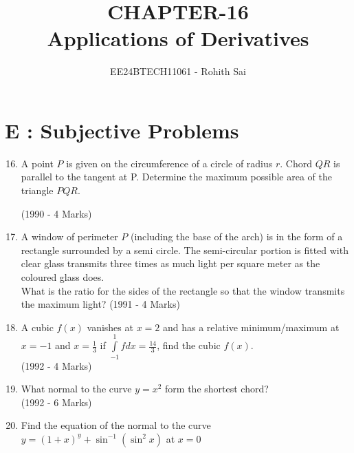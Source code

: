 \documentclass[journal,12pt,twocolumn]{IEEEtran}
\theoremstyle{remark}
\begin{document}

\vspace{3cm}

\title{CHAPTER-16\\Applications of Derivatives}
\author{EE24BTECH11061 - Rohith Sai}
\maketitle
\newpage
\bigskip

\renewcommand{\thefigure}{\theenumi}
\renewcommand{\thetable}{\theenumi}

\fontsize{12}{17}\selectfont
\section{E : Subjective Problems}

\begin{enumerate}
\setcounter{enumi}{15}
\item A point $P$ is given on the circumference of a circle of radius $r$. Chord $QR$ is parallel to the tangent at P. Determine the maximum possible area of the triangle $PQR.$

\hfill (1990 - 4 Marks)\\


\item A window of perimeter $P$ (including the base of the arch) is in the form of a rectangle surrounded by a semi circle. The semi-circular portion is fitted with clear glass transmits three times as much light per square meter as the coloured glass does.\\What is the ratio for the sides of the rectangle so that the window transmits the maximum light?
\hfill {(1991 - 4 Marks)}\\

\item A cubic $f(x)$ vanishes at $x=2$ and has a relative minimum/maximum at $x=-1$ and $x=\frac{1}{3}$ if $\int\limits_{-1}^1 f dx = \frac{14}{3}$, find the cubic $f(x)$.\\
\hfill (1992 - 4 Marks)\\

\item What normal to the curve $y=x^2$ form the shortest chord?\\
\hfill {(1992 - 6 Marks)}\\

\item Find the equation of the normal to the curve $y=(1+x)^y + \sin^{-1}(\sin^2x)$ at $x=0$


\end{enumerate}
\end{document}
